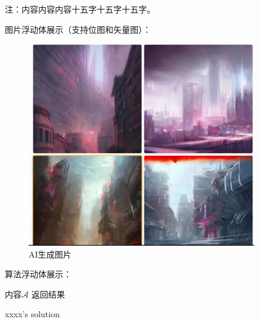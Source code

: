 {\begin{table}[h]
	\begin{tablenotes}
		\item 注：内容内容内容十五字十五字十五字。
	\end{tablenotes}
	
	\label{}
\end{table}

图片浮动体展示（支持位图和矢量图）：

\begin{figure}[htbp]
	\setlength{\abovecaptionskip}{0.2cm} %
	\setlength{\belowcaptionskip}{-0.2cm} %
	\centering
	\includegraphics[width=10cm]{figures/AI生成图片.jpg} %
	\caption{AI生成图片}
	\label{}
\end{figure}

\newpage %

算法浮动体展示：

\begin{algorithm}[htbp]
	\label{降重猪算法} %
	\SetAlgoLined
	内容$\mathcal{A}$\;
	返回结果\;
	\caption{xxxx's solution} %
\end{algorithm}



}
